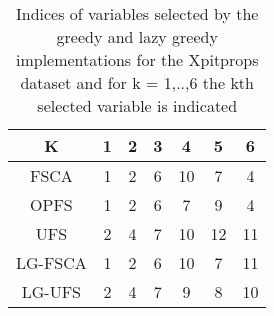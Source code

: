 \begin{table}
	\begin{center}
		\begin{tabular}{c c c c c c c}
			K & 1 & 2 & 3 & 4 & 5 & 6 \\
			\hline
			FSCA & 1 & 2 & 6 & 10 & 7 & 4 \\
			OPFS & 1 & 2 & 6 & 7 & 9 & 4 \\
			UFS & 2 & 4 & 7 & 10 & 12 & 11 \\
			LG-FSCA & 1 & 2 & 6 & 10 & 7 & 11 \\
			LG-UFS & 2 & 4 & 7 & 9 & 8 & 10 \\
		\end{tabular}
	\end{center}
	\caption{Indices of variables selected by the greedy and lazy greedy implementations for the Xpitprops dataset and for k = 1,..,6 the kth selected variable is indicated}
\end{table}